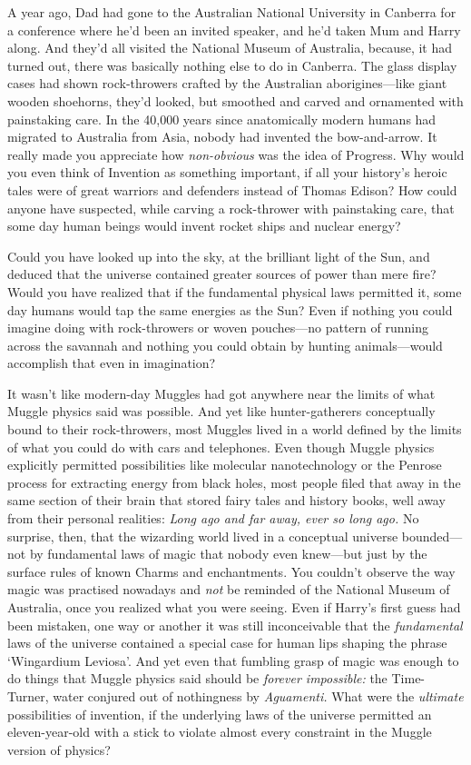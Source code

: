 A year ago, Dad had gone to the Australian National University in Canberra for a conference where he’d been an invited speaker, and he’d taken Mum and Harry along. And they’d all visited the National Museum of Australia, because, it had turned out, there was basically nothing else to do in Canberra. The glass display cases had shown rock-throwers crafted by the Australian aborigines—like giant wooden shoehorns, they’d looked, but smoothed and carved and ornamented with painstaking care. In the 40,000 years since anatomically modern humans had migrated to Australia from Asia, nobody had invented the bow-and-arrow. It really made you appreciate how \emph{non-obvious} was the idea of Progress. Why would you even think of Invention as something important, if all your history’s heroic tales were of great warriors and defenders instead of Thomas Edison? How could anyone have suspected, while carving a rock-thrower with painstaking care, that some day human beings would invent rocket ships and nuclear energy?

Could you have looked up into the sky, at the brilliant light of the Sun, and deduced that the universe contained greater sources of power than mere fire? Would you have realized that if the fundamental physical laws permitted it, some day humans would tap the same energies as the Sun? Even if nothing you could imagine doing with rock-throwers or woven pouches—no pattern of running across the savannah and nothing you could obtain by hunting animals—would accomplish that even in imagination?

It wasn’t like modern-day Muggles had got anywhere near the limits of what Muggle physics said was possible. And yet like hunter-gatherers conceptually bound to their rock-throwers, most Muggles lived in a world defined by the limits of what you could do with cars and telephones. Even though Muggle physics explicitly permitted possibilities like molecular nanotechnology or the Penrose process for extracting energy from black holes, most people filed that away in the same section of their brain that stored fairy tales and history books, well away from their personal realities: \emph{Long ago and far away, ever so long ago.} No surprise, then, that the wizarding world lived in a conceptual universe bounded—not by fundamental laws of magic that nobody even knew—but just by the surface rules of known Charms and enchantments. You couldn’t observe the way magic was practised nowadays and \emph{not} be reminded of the National Museum of Australia, once you realized what you were seeing. Even if Harry’s first guess had been mistaken, one way or another it was still inconceivable that the \emph{fundamental} laws of the universe contained a special case for human lips shaping the phrase ‘Wingardium Leviosa’. And yet even that fumbling grasp of magic was enough to do things that Muggle physics said should be \emph{forever impossible:} the Time-Turner, water conjured out of nothingness by \emph{Aguamenti.} What were the \emph{ultimate} possibilities of invention, if the underlying laws of the universe permitted an eleven-year-old with a stick to violate almost every constraint in the Muggle version of physics?

